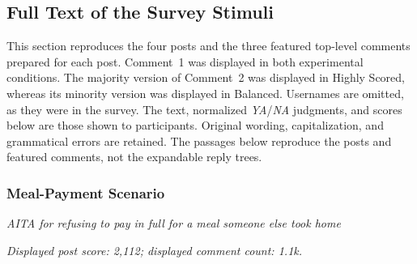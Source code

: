 \subsection{Full Text of the Survey Stimuli}
\label{app:full-survey-stimuli}

This section reproduces the four posts and the three featured
top-level comments prepared for each post. Comment~1 was displayed
in both experimental conditions. The majority version of Comment~2 was
displayed in Highly Scored, whereas its minority version was displayed in
Balanced. Usernames are omitted, as they were
in the survey. The text, normalized \textit{YA}/\textit{NA} judgments,
and scores below are those shown to participants. Original wording,
capitalization, and grammatical errors are retained. The passages below
reproduce the posts and featured comments, not the expandable reply trees.


\subsubsection{Meal-Payment Scenario}
\label{app:stimulus-1ip7tv4}

\textit{AITA for refusing to pay in full for a meal someone else took
home}

\noindent\textit{Displayed post score: 2,112; displayed comment count:
1.1k.}


